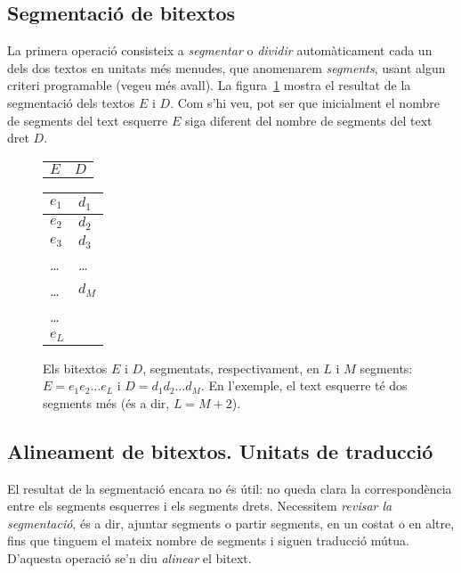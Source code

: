 \subsection{Segmentació de bitextos}
La primera operació consisteix a \emph{segmentar} o \emph{dividir}
automàticament cada un dels dos textos en unitats més menudes, que
anomenarem \emph{segments}, usant algun criteri programable (vegeu més
avall).  La figura~\ref{fg:segmentat} mostra el resultat de la
segmentació dels textos $E$ i $D$. Com s'hi veu, pot ser que
inicialment el nombre de segments del text esquerre $E$ siga diferent
del nombre de segments del text dret $D$.
\begin{figure}
  \begin{center}
    \begin{tabular}{p{3cm}p{3cm}}
           $E$ & $D$      
    \end{tabular}
    \begin{tabular}{|p{3cm}|p{3cm}|}
\hline
        $e_1$ & $d_1$ \\\hline
        $e_2$ & $d_2$ \\\hline
        $e_3$ & $d_3$ \\\hline
        \ldots & \ldots \\\hline
        \ldots  & $d_M$ \\\hline
        \ldots \\\cline{1-1}
        $e_L$ \\\cline{1-1}
    \end{tabular}
  \end{center}
  \caption{Els bitextos $E$ i $D$, segmentats, respectivament, en $L$
    i $M$ segments: $E=e_1e_2\ldots e_L$ i $D=d_1d_2\ldots d_M$. En
    l'exemple, el text esquerre té dos segments més (és a dir, $L=M+2$).}
  \label{fg:segmentat}  
\end{figure}


\subsection{Alineament de bitextos. Unitats de traducció}

El resultat de la segmentació encara no és útil: no queda clara la
correspondència entre els segments esquerres i els segments
drets. Necessitem \emph{revisar la segmentació}, és a dir, ajuntar
segments o partir segments, en un costat o en altre, fins que tinguem
el mateix nombre de segments i siguen traducció mútua. D'aquesta
operació se'n diu \emph{alinear} el bitext.

